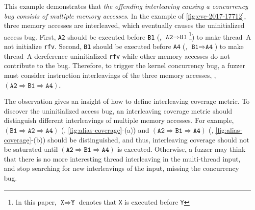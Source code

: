 %
This example demonstrates that \textit{the offending interleaving
  causing a concurrency bug consists of multiple memory accesses}.
%
In the example of \autoref{fig:cve-2017-17712}, three memory accesses
are interleaved, which eventually causes the uninitialized access bug.
%
First, \texttt{A2} should be executed before \texttt{B1} (\ie,
$\texttt{A2} \Rightarrow \texttt{B1}$\footnote{In this paper,
  $\texttt{X} \Rightarrow \texttt{Y}$ denotes that \texttt{X} is
  executed before \texttt{Y}}) to make thread~A not initialize
\texttt{rfv}.
%
Second, \texttt{B1} should be executed before \texttt{A4} (\ie,
$\texttt{B1} \Rightarrow \texttt{A4}$) to make thread~A dereference
uninitialized \texttt{rfv} while other memory accesses do not
contribute to the bug.
%
Therefore, to trigger the kernel concurrency bug, a fuzzer must
consider instruction interleavings of the three memory accesses, \eg,
$(\texttt{A2} \Rightarrow \texttt{B1} \Rightarrow \texttt{A4})$.


 The observation
gives an insight of how to define interleaving coverage metric.  To
discover the uninitialized access bug, an interleaving coverage metric
should distinguish different interleavings of multiple memory
accesses.
%
For example,
$(\texttt{B1} \Rightarrow \texttt{A2} \Rightarrow \texttt{A4})$ (\ie,
\autoref{fig:alias-coverage}-(a)) and
$(\texttt{A2} \Rightarrow \texttt{B1} \Rightarrow \texttt{A4})$ (\ie,
\autoref{fig:alias-coverage}-(b)) should be distinguished, and thus,
interleaving coverage should not be saturated until
$(\texttt{A2} \Rightarrow \texttt{B1} \Rightarrow \texttt{A4})$ is
executed.
%
Otherwise, a fuzzer may think that there is no more interesting thread
interleaving in the multi-thread input, and stop searching for new
interleavings of the input, missing the concurrency bug.

